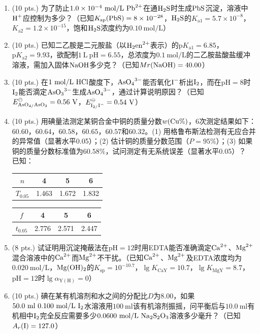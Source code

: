 \begin{enumerate}[label=\arabic*., itemsep=1.5ex]
    \item (10 pts.) 为了防止$1.0\times10^{-4}\ \mathrm{mol/L}\ \ce{Pb^{2+}}$在通$\ce{H2S}$时生成$\ce{PbS}$沉淀，溶液中$\ce{H+}$应控制为多少？（已知$K_{\mathrm{sp}}(\ce{PbS})=8\times10^{-28}$，$\ce{H2S}$的$K_{\mathrm{a1}}=5.7\times10^{-8}$，$K_{\mathrm{a2}}=1.2\times10^{-15}$，饱和$\ce{H2S}$浓度约为$0.10\ \mathrm{mol/L}$）
    \item (10 pts.) 已知二乙胺是二元胺盐（以$\ce{H2en^{2+}}$表示）的$\mathrm{p}K_{\mathrm{a1}}=6.85$，$\mathrm{p}K_{\mathrm{a2}}=9.93$，欲配制$1\ \mathrm{L}\ \mathrm{pH}=6.55$，总浓度为$0.1\ \mathrm{mol/L}$的二乙胺盐酸盐缓冲溶液，需加入固体$\ce{NaOH}$多少克？（已知$Mr(\ce{NaOH})=40.00$）
    \item (10 pts.) 在$1\ \mathrm{mol/L}\ \ce{HCl}$酸度下，$\ce{AsO4^{3-}}$能否氧化$\ce{I-}$析出$\ce{I2}$，而在$\mathrm{pH}=8$时$\ce{I2}$能否滴定$\ce{AsO3^{3-}}$生成$\ce{AsO4^{3-}}$，通过计算说明原因？（已知$E^\ominus_{\ce{AsO4/AsO3}}=0.56\ \mathrm{V}$，$E^\ominus_{\ce{I2/I-}}=0.54\ \mathrm{V}$）
    \item (10 pts.) 用碘量法测定某铜合金中铜的质量分数$w(\ce{Cu}\%)$，6次测定结果如下：$60.60$，$60.64$，$60.58$，$60.65$，$60.57$和$60.32$。(1) 用格鲁布斯法检测有无应合并的异常值（显著水平0.05）；(2) 估计铜的质量分数范围（$P=95\%$）；(3) 如果铜的质量分数标准值为$60.58\%$，试问测定有无系统误差（显著水平0.05）？
    \\
    已知：
    \begin{center}
    \begin{minipage}{0.45\linewidth}
    \centering
    \begin{tabular}{c|ccc}
    $n$ & 4 & 5 & 6 \\
    \hline
    $T_{0.05}$ & 1.463 & 1.672 & 1.832 \\
    \end{tabular}
    \end{minipage}
    \hfill
    \begin{minipage}{0.45\linewidth}
    \centering
    \begin{tabular}{c|ccc}
    $f$ & 4 & 5 & 6 \\
    \hline
    $t_{0.05}$ & 2.776 & 2.571 & 2.447 \\
    \end{tabular}
    \end{minipage}
    \end{center}
    \item (8 pts.) 试证明用沉淀掩蔽法在$\mathrm{pH}=12$时用EDTA能否准确滴定$\ce{Ca^{2+}}$、$\ce{Mg^{2+}}$混合溶液中的$\ce{Ca^{2+}}$而$\ce{Mg^{2+}}$不干扰。（已知$\ce{Ca^{2+}}$、$\ce{Mg^{2+}}$及EDTA浓度均为$0.020\ \mathrm{mol/L}$，$\ce{Mg(OH)2}$的$K_{\mathrm{sp}}=10^{-10.7}$，$\lg K_{\mathrm{CaY}}=10.7$，$\lg K_{\mathrm{MgY}}=8.7$，$\mathrm{pH}=12$时$\lg\alpha_{\mathrm{Y(H)}}=0$）
    \item (10 pts.) 碘在某有机溶剂和水之间的分配比$D$为$8.00$，如果$50.0\ \mathrm{ml}\ 0.100\ \mathrm{mol/L}\ \ce{I2}$水溶液用$100\ \mathrm{ml}$该有机溶剂振摇，问平衡后与$10.0\ \mathrm{ml}$有机相中$\ce{I2}$完全反应需要多少$0.0600\ \mathrm{mol/L}\ \ce{Na2S2O3}$溶液多少毫升？（已知$A_r(\ce{I})=127.0$）
\end{enumerate}